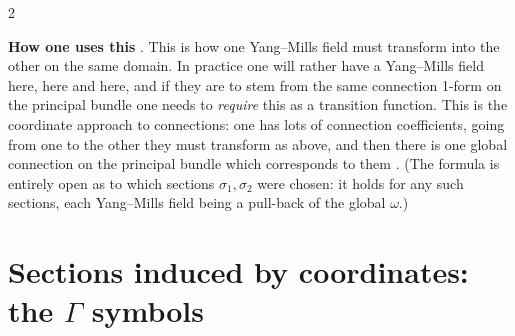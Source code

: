 \begin{paracol}{2}
\begin{coursenote}
\end{coursenote}
\textbf{How one uses this} . This is how one Yang--Mills field must transform into the other on the same domain. In practice one will rather have a Yang--Mills field here, here and here, and if they are to stem from the same connection 1-form on the principal bundle one needs to \emph{require} this as a transition function. This is the coordinate approach to connections: one has lots of connection coefficients, going from one to the other they must transform as above, and then there is one global connection on the principal bundle which corresponds to them   . (The formula is entirely open as to which sections $\sigma_1,\sigma_2$ were chosen: it holds for any such sections, each Yang--Mills field being a pull-back of the global $\omega$.)

\section{Sections induced by coordinates: the $\Gamma$ symbols}\label{sec:ym-gamma}


\end{paracol}
